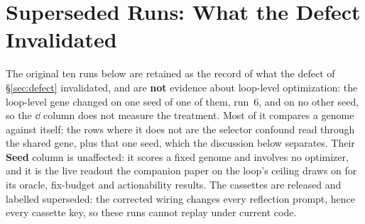\documentclass[11pt]{article}
\begin{document}
\section{Superseded Runs: What the Defect Invalidated}
\label{sec:superseded}

The original ten runs below are retained as the record of what the defect of
\S\ref{sec:defect} invalidated, and are \textbf{not} evidence about loop-level
optimization: the loop-level gene changed on one seed of one of them, run~6, and on no other
seed, so the $\dd$ column does not measure the treatment. Most of it compares a genome against
itself; the rows where it does not are the selector confound read through the shared gene, plus
that one seed, which the discussion below separates. Their \textbf{Seed} column is unaffected: it
scores a fixed genome and involves no optimizer, and it is the live readout the companion
paper on the loop's ceiling draws on for its oracle, fix-budget and actionability results. The
cassettes are released and labelled superseded: the corrected wiring changes every reflection
prompt, hence every cassette key, so these runs cannot replay under current code.
\end{document}
